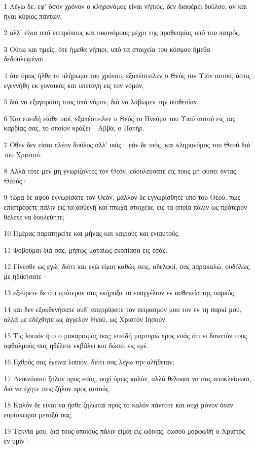 \par 1 Λέγω δε, εφ' όσον χρόνον ο κληρονόμος είναι νήπιος, δεν διαφέρει δούλου, αν και ήναι κύριος πάντων,
\par 2 αλλ' είναι υπό επιτρόπους και οικονόμους μέχρι της προθεσμίας υπό του πατρός.
\par 3 Ούτω και ημείς, ότε ήμεθα νήπιοι, υπό τα στοιχεία του κόσμου ήμεθα δεδουλωμένοι·
\par 4 ότε όμως ήλθε το πλήρωμα του χρόνου, εξαπέστειλεν ο Θεός τον Υιόν αυτού, όστις εγεννήθη εκ γυναικός και υπετάγη εις τον νόμον,
\par 5 διά να εξαγοράση τους υπό νόμον, διά να λάβωμεν την υιοθεσίαν.
\par 6 Και επειδή είσθε υιοί, εξαπέστειλεν ο Θεός το Πνεύμα του Υιού αυτού εις τας καρδίας σας, το οποίον κράζει· Αββά, ο Πατήρ.
\par 7 Όθεν δεν είσαι πλέον δούλος αλλ' υιός· εάν δε υιός, και κληρονόμος του Θεού διά του Χριστού.
\par 8 Αλλά τότε μεν μη γνωρίζοντες τον Θεόν, εδουλεύσατε εις τους μη φύσει όντας Θεούς·
\par 9 τώρα δε αφού εγνωρίσατε τον Θεόν, μάλλον δε εγνωρίσθητε υπό του Θεού, πως επιστρέφετε πάλιν εις τα ασθενή και πτωχά στοιχεία, εις τα οποία πάλιν ως πρότερον θέλετε να δουλεύητε;
\par 10 Ημέρας παρατηρείτε και μήνας και καιρούς και ενιαυτούς.
\par 11 Φοβούμαι διά σας, μήπως ματαίως εκοπίασα εις εσάς.
\par 12 Γίνεσθε ως εγώ, διότι και εγώ είμαι καθώς σεις, αδελφοί, σας παρακαλώ, ουδόλως με ηδικήσατε·
\par 13 εξεύρετε δε ότι πρότερον σας εκήρυξα το ευαγγέλιον εν ασθενεία της σαρκός,
\par 14 και δεν εξουθενήσατε ουδ' απερρίψατε τον πειρασμόν μου τον εν τη σαρκί μου, αλλά με εδέχθητε ως άγγελον Θεού, ως Χριστόν Ιησούν.
\par 15 Τις λοιπόν ήτο ο μακαρισμός σας; επειδή μαρτυρώ προς εσάς ότι ει δυνατόν τους οφθαλμούς σας ηθέλετε εκβάλει και δώσει εις εμέ.
\par 16 Εχθρός σας έγεινα λοιπόν, διότι σας λέγω την αλήθειαν;
\par 17 Δεικνύουσι ζήλον προς εσάς, ουχί όμως καλόν, αλλά θέλουσι να σας αποκλείσωσι, διά να έχητε σεις ζήλον προς αυτούς.
\par 18 Καλόν δε είναι να ήσθε ζηλωταί προς το καλόν πάντοτε και ουχί μόνον όταν ευρίσκωμαι μεταξύ σας.
\par 19 Τεκνία μου, διά τους οποίους πάλιν είμαι εις ωδίνας, εωσού μορφωθή ο Χριστός εν υμίν·
